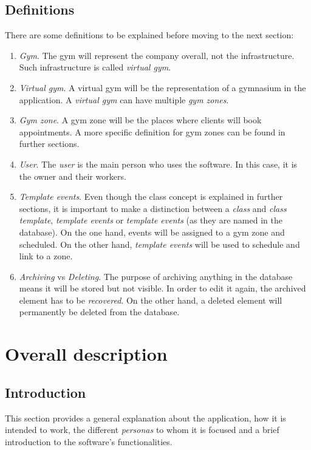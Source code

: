 \documentclass[a4paper, 12pt, oneside]{book}
\begin{document}
\subsection{Definitions}
There are some definitions to be explained before moving to the next section:
\begin{enumerate}[label = -]
	\item \emph{Gym}. The gym will represent the company overall, not the infrastructure. Such infrastructure is called \emph{virtual gym}.
	\item \emph{Virtual gym}. A virtual gym will be the representation of a gymnasium in the application. A \emph{virtual gym} can have multiple \emph{gym zones}.
	\item \emph{Gym zone}. A gym zone will be the places where clients will book appointments. A more specific definition for gym zones can be found in further sections.
	\item \emph{User}. The \emph{user} is the main person who uses the software. In this case, it is the owner and their workers.
	\item \emph{Template events}. Even though the class concept is explained in further sections, it is important to make a distinction between a \emph{class} and \emph{class template}, \emph{template events} or \emph{template events} (as they are named in the database). On the one hand, events will be assigned to a gym zone and scheduled. On the other hand, \emph{template events} will be used to schedule and link to a zone.
	\item \emph{Archiving} vs \emph{Deleting}. The purpose of archiving anything in the database means it will be stored but not visible. In order to edit it again, the archived element has to be \emph{recovered}. On the other hand, a deleted element will permanently be deleted from the database.
\end{enumerate}
\section{Overall description}
\subsection{Introduction}
This section provides a general explanation about the application, how it is intended to work, the different \emph{personas} to whom it is focused and a brief introduction to the software's functionalities.
\end{document}
